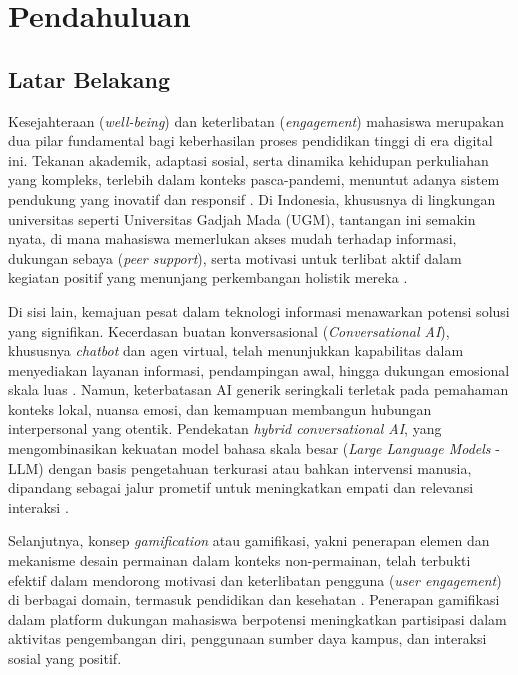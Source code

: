 \chapter{Pendahuluan}

\section{Latar Belakang}
\label{sec:latar_belakang}


Kesejahteraan (\textit{well-being}) dan keterlibatan (\textit{engagement}) mahasiswa merupakan dua pilar fundamental bagi keberhasilan proses pendidikan tinggi di era digital ini. Tekanan akademik, adaptasi sosial, serta dinamika kehidupan perkuliahan yang kompleks, terlebih dalam konteks pasca-pandemi, menuntut adanya sistem pendukung yang inovatif dan responsif \cite{wellbeing_digital_learning_2021}. Di Indonesia, khususnya di lingkungan universitas seperti Universitas Gadjah Mada (UGM), tantangan ini semakin nyata, di mana mahasiswa memerlukan akses mudah terhadap informasi, dukungan sebaya (\textit{peer support}), serta motivasi untuk terlibat aktif dalam kegiatan positif yang menunjang perkembangan holistik mereka \cite{kesejahteraan_mental_mahasiswa_cybersecurity_2025}.

Di sisi lain, kemajuan pesat dalam teknologi informasi menawarkan potensi solusi yang signifikan. Kecerdasan buatan konversasional (\textit{Conversational AI}), khususnya \textit{chatbot} dan agen virtual, telah menunjukkan kapabilitas dalam menyediakan layanan informasi, pendampingan awal, hingga dukungan emosional skala luas \cite{ai_chatbots_education_advances_2024}. Namun, keterbatasan AI generik seringkali terletak pada pemahaman konteks lokal, nuansa emosi, dan kemampuan membangun hubungan interpersonal yang otentik. Pendekatan \textit{hybrid conversational AI}, yang mengombinasikan kekuatan model bahasa skala besar (\textit{Large Language Models} - LLM) dengan basis pengetahuan terkurasi atau bahkan intervensi manusia, dipandang sebagai jalur prometif untuk meningkatkan empati dan relevansi interaksi \cite{empathetic_conversational_agents_mental_health_2024}.

Selanjutnya, konsep \textit{gamification} atau gamifikasi, yakni penerapan elemen dan mekanisme desain permainan dalam konteks non-permainan, telah terbukti efektif dalam mendorong motivasi dan keterlibatan pengguna (\textit{user engagement}) di berbagai domain, termasuk pendidikan dan kesehatan \cite{gamification_motivation_engagement_chemistry_2021, gamification_engagement_moderating_concentration_2024}. Penerapan gamifikasi dalam platform dukungan mahasiswa berpotensi meningkatkan partisipasi dalam aktivitas pengembangan diri, penggunaan sumber daya kampus, dan interaksi sosial yang positif.

